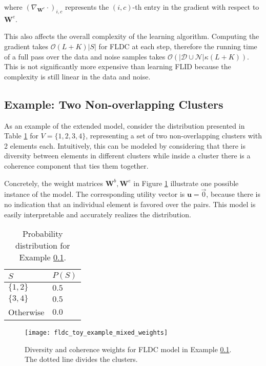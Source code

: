 where $\left(\nabla_{\mathbf{W}^{e}}\cdot \right)_{i,c}$ represents the $(i,c)$-th entry in the gradient with respect to $\mathbf{W}^{e}$.

This also affects the overall complexity of the learning algorithm. Computing the gradient takes $\mathcal{O}(L+K)|S|$ for FLDC at each step, therefore the running time of a full pass over the data and noise samples takes $\mathcal{O}(|\mathcal{D}\cup\mathcal{N}|\kappa(L+K))$. This is not significantly more expensive than learning FLID because the complexity is still linear in the data and noise.


\subsection{Example: Two Non-overlapping Clusters}
\label{sec:fldc-toy}

As an example of the extended model, consider the distribution presented in Table \ref{tab:fldc-toy-probs} for $V = \{1,2,3,4\}$, representing a set of two non-overlapping clusters with 2 elements each. Intuitively, this can be modeled by considering that there is diversity between elements in different clusters while inside a cluster there is a coherence component that ties them together.

Concretely, the weight matrices $\mathbf{W}^{b}, \mathbf{W}^{e}$ in Figure \ref{fig:fldc-toy-mixed-weights} illustrate one possible instance of the model. The corresponding utility vector is $\mathbf{u} = \overrightarrow{0}$, because there is no indication that an individual element is favored over the pairs. This model is easily interpretable and accurately realizes the distribution.

\begin{table}
  \centering
  \caption{Probability distribution for Example \ref{sec:fldc-toy}.}
  \begin{tabular}{@{}ll@{}}
    \toprule
    $S$ & $P(S)$  \\
    \midrule
    $\{1,2\}$ & $0.5$ \\
    $\{3,4\}$ & $0.5$ \\
    Otherwise & $0.0$ \\
    \bottomrule
  \end{tabular}
  \label{tab:fldc-toy-probs}
\end{table}

\begin{figure}
  \centering
  \texttt{[image: fldc\_toy\_example\_mixed\_weights]}
  \caption{Diversity and coherence weights for FLDC model in Example \ref{sec:fldc-toy}. The dotted line divides the clusters.}
  \label{fig:fldc-toy-mixed-weights}
\end{figure}

